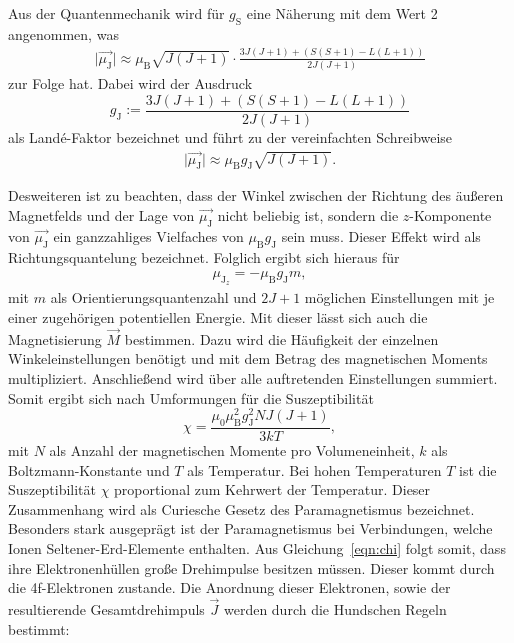 \noindent Aus der Quantenmechanik wird für $g_\text{S}$ eine Näherung mit dem Wert 2 angenommen, was
\begin{align*}
\vert\vec{\mu_\text{J}}\vert \approx \mu_\text{B}\sqrt{J(J+1)} \cdot \frac{3J(J+1)+(S(S+1)-L(L+1))}{2J(J+1)}
\end{align*}
zur Folge hat.
Dabei wird der Ausdruck
\begin{equation}
  \label{eqn:lande}
g_\text{J}:= \frac{3J(J+1)+(S(S+1)-L(L+1))}{2J(J+1)}
\end{equation}
als Landé-Faktor bezeichnet und führt zu der vereinfachten Schreibweise
\begin{align*}
\vert\vec{\mu_\text{J}}\vert \approx \mu_\text{B}g_\text{J}\sqrt{J(J+1)}.
\end{align*}

\noindent Desweiteren ist zu beachten, dass der Winkel zwischen der Richtung des äußeren
Magnetfelds und der Lage von $\vec{\mu_\text{J}}$ nicht beliebig ist, sondern die $z$-Komponente
von $\vec{\mu_\text{J}}$ ein ganzzahliges Vielfaches von $\mu_\text{B}g_\text{J}$ sein muss.
Dieser Effekt wird als Richtungsquantelung bezeichnet. Folglich ergibt sich hieraus für
\begin{align*}
\mu_{\text{J}_z} = - \mu_\text{B}g_\text{J}m,
\end{align*}
mit $m$ als Orientierungsquantenzahl und $2J+1$ möglichen Einstellungen mit je einer
zugehörigen potentiellen Energie. Mit dieser lässt sich auch die Magnetisierung $\vec{M}$ bestimmen.
Dazu wird die Häufigkeit der einzelnen Winkeleinstellungen benötigt und mit dem Betrag des
magnetischen Moments multipliziert. Anschließend wird über alle auftretenden Einstellungen summiert.
Somit ergibt sich nach Umformungen für die Suszeptibilität
\begin{equation}
\label{eqn:chi}
\chi = \frac{\mu_0\mu_\text{B}^2g_\text{J}^2NJ(J+1)}{3kT},
\end{equation}
mit $N$ als Anzahl der magnetischen Momente pro Volumeneinheit, $k$ als Boltzmann-Konstante und $T$
als Temperatur. Bei hohen Temperaturen $T$ ist die Suszeptibilität $\chi$ proportional zum
Kehrwert der Temperatur. Dieser Zusammenhang wird als Curiesche Gesetz des Paramagnetismus
bezeichnet.
Besonders stark ausgeprägt ist der Paramagnetismus bei Verbindungen, welche Ionen Seltener-Erd-Elemente
enthalten. Aus Gleichung~\ref{eqn:chi} folgt somit, dass ihre Elektronenhüllen große Drehimpulse
besitzen müssen. Dieser kommt durch die 4f-Elektronen zustande. Die Anordnung dieser Elektronen,
sowie der resultierende Gesamtdrehimpuls $\vec{J}$ werden durch die Hundschen Regeln bestimmt:
